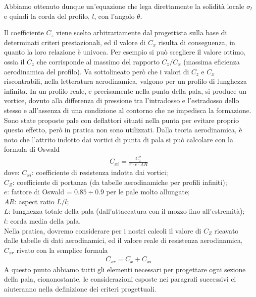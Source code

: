 Abbiamo ottenuto dunque un'equazione che lega direttamente la solidità locale $\sigma_l$ e quindi la corda del profilo, $l$, con l'angolo $\theta$.

Il coefficiente $C_z$ viene scelto arbitrariamente dal progettista sulla base di determinati criteri prestazionali, ed il valore di $C_x$ risulta di conseguenza, in quanto la loro relazione è univoca. Per esempio si può scegliere il valore ottimo, ossia il $C_z$ che corrisponde al massimo del rapporto $C_z/C_x$ (massima eficienza aerodinamica del profilo). Va sottolineato però che i valori di $C_z$ e $C_x$ riscontrabili, nella letteratura aerodinamica, valgono per un profilo di lunghezza infinita. In un profilo reale, e precisamente nella punta della pala, si produce un vortice, dovuto alla differenza di pressione tra l'intradosso e l'estradosso dello stesso e all'assenza di una condizione al contorno che ne impedisca la formazione. Sono state proposte pale con deflattori situati nella punta per evitare proprio questo effetto, però in pratica non sono utilizzati. Dalla teoria aerodinamica, è noto che l'attrito indotto dai vortici di punta di pala si può calcolare con la formula di Oswald
\begin{align*}
C_{xi} = \frac{C_z^2}{\pi \cdot e \cdot AR}
\end{align*}
dove:
$C_{xi}$: coefficiente di resistenza indotta dai vortici;\\
$C_Z$: coefficiente di portanza (da tabelle aerodinamiche per profili infiniti);\\
$e$: fattore di Oswald = $0.85 \div 0.9$ per le pale molto allungate;\\
$AR$: aspect ratio $L/l$;\\
$L$: lunghezza totale della pala (dall'attaccatura con il mozzo fino all'estremità);\\
$l$: corda media della pala.\\[2mm]
Nella pratica, dovremo considerare per i nostri calcoli il valore di $C_Z$ ricavato dalle tabelle di dati aerodinamici, ed il valore reale di resistenza aerodinamica, $C_{xr}$ rivato con la semplice formula
\begin{align*}
C_{xr} = C_x + C_{xi}
\end{align*}
A questo punto abbiamo tutti gli elementi necessari per progettare ogni sezione della pala, ciononostante, le considerazioni esposte nei paragrafi successivi ci aiuteranno nella definizione dei criteri progettuali.

